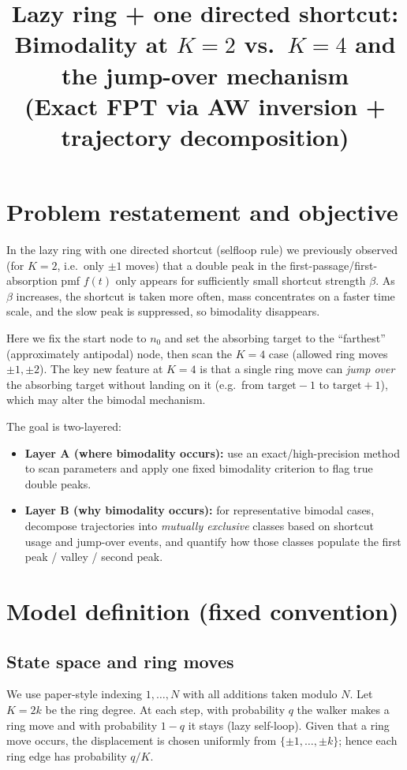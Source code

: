 \documentclass[11pt]{article}
\title{Lazy ring + one directed shortcut:\\Bimodality at $K=2$ vs.\ $K=4$ and the jump-over mechanism\\(Exact FPT via AW inversion + trajectory decomposition)}
\author{}
\date{}
\begin{document}
\maketitle

\section{Problem restatement and objective}
In the lazy ring with one directed shortcut (selfloop rule) we previously observed (for $K=2$, i.e.\ only $\pm 1$ moves) that a double peak in the first-passage/first-absorption pmf $f(t)$ only appears for sufficiently small shortcut strength $\beta$.
As $\beta$ increases, the shortcut is taken more often, mass concentrates on a faster time scale, and the slow peak is suppressed, so bimodality disappears.

Here we fix the start node to $n_0$ and set the absorbing target to the ``farthest'' (approximately antipodal) node, then scan the $K=4$ case (allowed ring moves $\pm 1,\pm 2$).
The key new feature at $K=4$ is that a single ring move can \emph{jump over} the absorbing target without landing on it (e.g.\ from $\mathrm{target}-1$ to $\mathrm{target}+1$), which may alter the bimodal mechanism.

The goal is two-layered:
\begin{itemize}
  \item \textbf{Layer A (where bimodality occurs):} use an exact/high-precision method to scan parameters and apply one fixed bimodality criterion to flag true double peaks.
  \item \textbf{Layer B (why bimodality occurs):} for representative bimodal cases, decompose trajectories into \emph{mutually exclusive} classes based on shortcut usage and jump-over events, and quantify how those classes populate the first peak / valley / second peak.
\end{itemize}

\section{Model definition (fixed convention)}
\subsection{State space and ring moves}
We use paper-style indexing $1,\dots,N$ with all additions taken modulo $N$.
Let $K=2k$ be the ring degree. At each step, with probability $q$ the walker makes a ring move and with probability $1-q$ it stays (lazy self-loop).
Given that a ring move occurs, the displacement is chosen uniformly from $\{\pm 1,\dots,\pm k\}$; hence each ring edge has probability $q/K$.
\end{document}
